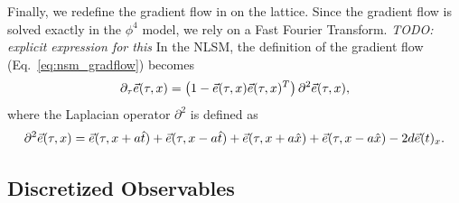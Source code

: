 Finally, we redefine the gradient flow in on the lattice. Since the gradient flow is solved exactly in the $\phi^4$ model, we rely on a Fast Fourier Transform. \textit{TODO: explicit expression for this} In the NLSM, the definition of the gradient flow (Eq.~\ref{eq:nsm_gradflow}) becomes 
\begin{equation}
    \label{eq:nsm_gradflow_disc}
    \partial_\tau \vec e (\tau, x) = \left( 1 - \vec e(\tau,x) \vec e(\tau,x)^T\right) \partial^2 \vec e(\tau,x),
\end{equation}
 where the Laplacian operator $\partial^2$ is defined as
\begin{equation*}
    \partial^2 \vec e(\tau,x) = \vec e(\tau, x+a \hat{t}) + \vec e(\tau,x-a\hat t) + \vec e(\tau, x+a \hat{x}) + \vec e(\tau,x-a\hat x) - 2 d \vec e(t)_x.
\end{equation*}


\subsection{Discretized Observables}

